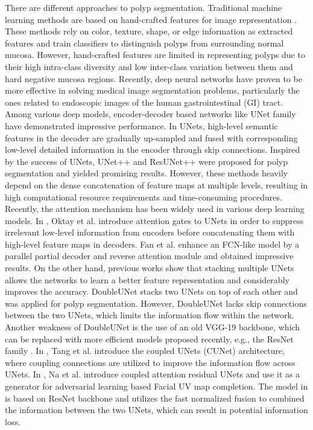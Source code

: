 \documentclass[review, sort&compress]{elsarticle}
\begin{document}
	There are different approaches to polyp segmentation. Traditional machine learning methods are based on hand-crafted features for image representation  \cite{iwahori2013automatic, silva2014toward}. These methods rely on color, texture, shape, or edge information as extracted features and train classifiers to distinguish polyps from surrounding normal mucosa. However, hand-crafted features are limited in representing polyps due to their high intra-class diversity and low inter-class variation between them and hard negative mucosa regions. Recently, deep neural networks have proven to be more effective in solving medical image segmentation problems, particularly the ones related to endoscopic images of the human gastrointestinal (GI) tract. Among various deep models, encoder-decoder based networks like UNet family \cite{ronneberger2015u} have demonstrated impressive performance. In UNets, high-level semantic features in the decoder are gradually up-sampled and fused with corresponding low-level detailed information in the encoder through skip connections. Inspired by the success of UNets, UNet++ \cite{zhou2019unet++} and ResUNet++ \cite{jha2019resunet++} were proposed for polyp segmentation and yielded promising results. However, these methods heavily depend on the dense concatenation of feature maps at multiple levels, resulting in high computational resource requirements and time-consuming procedures. Recently, the attention mechanism has been widely used in various deep learning models. In \cite{oktay2018attention}, Oktay et al. introduce attention gates to UNets in order to suppress irrelevant low-level information from encoders before concatenating them with high-level feature maps in decoders. Fan et al. \cite{fan2020pranet} enhance an FCN-like model by a parallel partial decoder and reverse attention module and obtained impressive results.
	On the other hand, previous works show that stacking multiple UNets allows the networks to learn a better feature representation and considerably improves the accuracy. DoubleUNet \cite{jha2020doubleu} stacks two UNets on top of each other and was applied for polyp segmentation. However, DoubleUNet lacks skip connections between the two UNets, which limits the information flow within the network. Another weakness of DoubleUNet is the use of an old VGG-19 backbone, which can be replaced with more efficient models proposed recently, e.g., the ResNet family \cite{xie2017aggregated,he2016deep,zhang2020resnest}. In \cite{tang2019cu}, Tang et al. introduce the coupled UNets (CUNet) architecture, where coupling connections are utilized to improve the information flow across UNets. In \cite{na2020facial}, Na et al. introduce coupled attention residual UNets and use it as a generator for adversarial learning based Facial UV map completion. The model in \cite{na2020facial} is based on ResNet backbone and utilizes the fast normalized fusion \cite{tan2020efficientdet} to combined the information between the two UNets, which can result in potential information loss.
	
\end{document}
